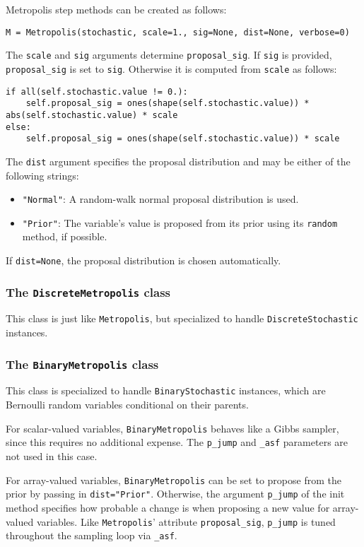 Metropolis step methods can be created as follows:
\begin{verbatim}
M = Metropolis(stochastic, scale=1., sig=None, dist=None, verbose=0)
\end{verbatim}
The \texttt{scale} and \texttt{sig} arguments determine \texttt{proposal\_sig}. If \texttt{sig} is provided, \texttt{proposal\_sig} is set to \texttt{sig}. Otherwise it is computed from \texttt{scale} as follows:
\begin{verbatim}
if all(self.stochastic.value != 0.):
    self.proposal_sig = ones(shape(self.stochastic.value)) * abs(self.stochastic.value) * scale
else:
    self.proposal_sig = ones(shape(self.stochastic.value)) * scale
\end{verbatim}

The \texttt{dist} argument specifies the proposal distribution and may be either of the following strings:
\begin{itemize}
    \item \texttt{"Normal"}: A random-walk normal proposal distribution is used.
    \item \texttt{"Prior"}: The variable's value is proposed from its prior using its \texttt{random} method, if possible.
\end{itemize}
If \texttt{dist=None}, the proposal distribution is chosen automatically.

\subsubsection{The \texttt{DiscreteMetropolis} class}
This class is just like \texttt{Metropolis}, but specialized to handle \texttt{DiscreteStochastic} instances.

\subsubsection{The \texttt{BinaryMetropolis} class} 
This class is specialized to handle \texttt{BinaryStochastic} instances, which are Bernoulli random variables conditional on their parents. 

For scalar-valued variables, \texttt{BinaryMetropolis} behaves like a Gibbs sampler, since this requires no additional expense. The \texttt{p_jump} and \texttt{_asf} parameters are not used in this case.

For array-valued variables, \texttt{BinaryMetropolis} can be set to propose from the prior by passing in \texttt{dist="Prior"}. Otherwise, the argument \texttt{p_jump} of the init method specifies how probable a change is when proposing a new value for array-valued variables. Like \texttt{Metropolis}' attribute \texttt{proposal_sig}, \texttt{p_jump} is tuned throughout the sampling loop via \texttt{_asf}.



